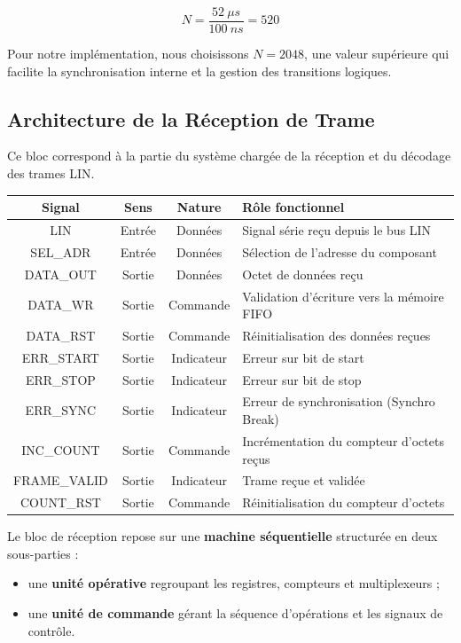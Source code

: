 \[
N = \frac{52~\mu s}{100~ns} = 520
\]

Pour notre implémentation, nous choisissons \(N = 2048\), une valeur supérieure qui facilite la synchronisation interne et la gestion des transitions logiques.

\subsection{Architecture de la Réception de Trame}

Ce bloc correspond à la partie du système chargée de la réception et du décodage des trames LIN.

\begin{center}
\renewcommand{\arraystretch}{1.2}
\small
\begin{tabularx}{\textwidth}{|c||c|c|X|}
\hline
\textbf{Signal} & \textbf{Sens} & \textbf{Nature} & \textbf{Rôle fonctionnel} \\ \hline
LIN & Entrée & Données & Signal série reçu depuis le bus LIN \\ 
SEL\_ADR & Entrée & Données & Sélection de l’adresse du composant \\ 
DATA\_OUT & Sortie & Données & Octet de données reçu \\ 
DATA\_WR & Sortie & Commande & Validation d’écriture vers la mémoire FIFO \\ 
DATA\_RST & Sortie & Commande & Réinitialisation des données reçues \\ 
ERR\_START & Sortie & Indicateur & Erreur sur bit de start \\ 
ERR\_STOP & Sortie & Indicateur & Erreur sur bit de stop \\ 
ERR\_SYNC & Sortie & Indicateur & Erreur de synchronisation (Synchro Break) \\ 
INC\_COUNT & Sortie & Commande & Incrémentation du compteur d’octets reçus \\ 
FRAME\_VALID & Sortie & Indicateur & Trame reçue et validée \\ 
COUNT\_RST & Sortie & Commande & Réinitialisation du compteur d’octets \\ 
\hline
\end{tabularx}
\end{center}

\medskip

Le bloc de réception repose sur une \textbf{machine séquentielle} structurée en deux sous-parties :
\begin{itemize}
    \item une \textbf{unité opérative} regroupant les registres, compteurs et multiplexeurs ;
    \item une \textbf{unité de commande} gérant la séquence d’opérations et les signaux de contrôle.
\end{itemize}

